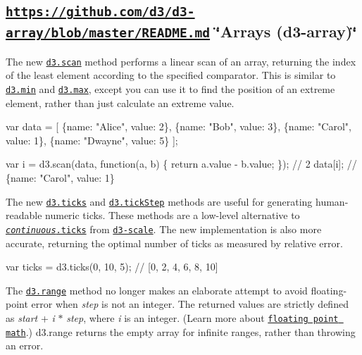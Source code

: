 \subsection*{\href{https://github.com/d3/d3-array/blob/master/README.md}{\tt https\+://github.\+com/d3/d3-\/array/blob/master/\+R\+E\+A\+D\+M\+E.\+md} \char`\"{}\+Arrays (d3-\/array)\char`\"{}}

The new \href{https://github.com/d3/d3-array/blob/master/README.md#scan}{\tt d3.\+scan} method performs a linear scan of an array, returning the index of the least element according to the specified comparator. This is similar to \href{https://github.com/d3/d3-array/blob/master/README.md#min}{\tt d3.\+min} and \href{https://github.com/d3/d3-array/blob/master/README.md#max}{\tt d3.\+max}, except you can use it to find the position of an extreme element, rather than just calculate an extreme value.


\begin{DoxyCode}
var data = [
  \{name: "Alice", value: 2\},
  \{name: "Bob", value: 3\},
  \{name: "Carol", value: 1\},
  \{name: "Dwayne", value: 5\}
];

var i = d3.scan(data, function(a, b) \{ return a.value - b.value; \}); // 2
data[i]; // \{name: "Carol", value: 1\}
\end{DoxyCode}


The new \href{https://github.com/d3/d3-array/blob/master/README.md#ticks}{\tt d3.\+ticks} and \href{https://github.com/d3/d3-array/blob/master/README.md#tickStep}{\tt d3.\+tick\+Step} methods are useful for generating human-\/readable numeric ticks. These methods are a low-\/level alternative to \href{https://github.com/d3/d3-scale/blob/master/README.md#continuous_ticks}{\tt {\itshape continuous}.ticks} from \href{https://github.com/d3/d3-scale}{\tt d3-\/scale}. The new implementation is also more accurate, returning the optimal number of ticks as measured by relative error.


\begin{DoxyCode}
var ticks = d3.ticks(0, 10, 5); // [0, 2, 4, 6, 8, 10]
\end{DoxyCode}


The \href{https://github.com/d3/d3-array/blob/master/README.md#range}{\tt d3.\+range} method no longer makes an elaborate attempt to avoid floating-\/point error when {\itshape step} is not an integer. The returned values are strictly defined as {\itshape start} + {\itshape i} $\ast$ {\itshape step}, where {\itshape i} is an integer. (Learn more about \href{http://0.30000000000000004.com/}{\tt floating point math}.) d3.\+range returns the empty array for infinite ranges, rather than throwing an error.

